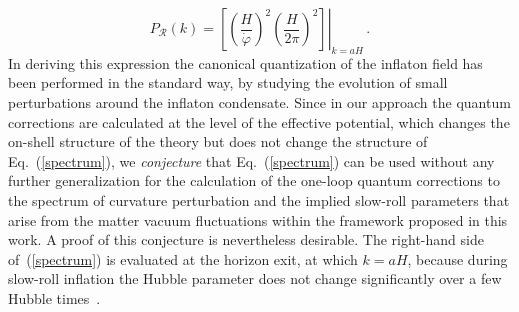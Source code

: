 \begin{equation}
P_{\mathcal{R}}(k) = \left.\left[
\left(\frac{H}{\dot{\varphi}}\right)^2\left(\frac{H}{2\pi}\right)^2\right]\right|_{k=aH}\,.
\label{spectrum}
\end{equation}
In deriving this expression the canonical quantization of the inflaton field
has been performed in the standard way, by studying the evolution of
small perturbations around the inflaton condensate.
Since in our approach the quantum corrections are calculated
 at the level of the effective potential,
which changes the on-shell structure of the theory but does not
change the structure of Eq.~(\ref{spectrum}), we {\it conjecture}
that Eq.~(\ref{spectrum}) can be used without any further
generalization for the calculation of the one-loop quantum
corrections to the spectrum of curvature perturbation and the
implied slow-roll parameters that arise from the matter vacuum
fluctuations within the framework proposed in this work. A proof
of this conjecture is nevertheless desirable. The right-hand side
of~(\ref{spectrum}) is evaluated at the horizon exit, at which
$k=aH$, because during slow-roll inflation the Hubble parameter
does not change significantly over a few Hubble
times~\cite{Liddle:2000cg}.

